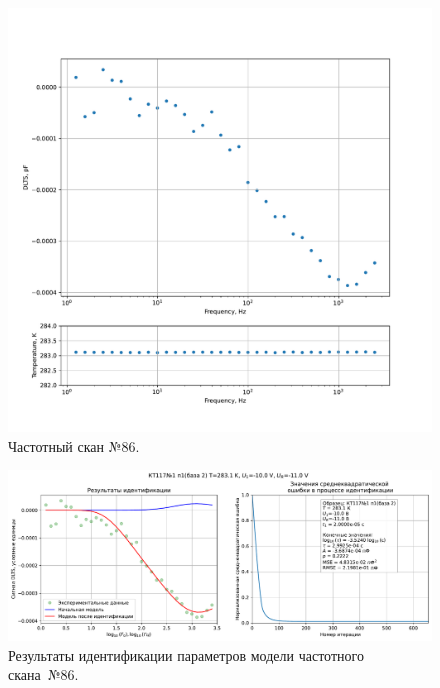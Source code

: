 \begin{figure}[!ht]
    \centering
    \includegraphics[width=1\textwidth]{../plots/КТ117№1_п1(база 2)_2500Гц-1Гц_1пФ_+10С_-10В-11В_10мВ_20мкс_шаг_0,1.pdf}
    \caption{Частотный скан №86.}
    \label{pic:frequency_scan_86}
\end{figure}

\begin{figure}[!ht]
    \centering
    \includegraphics[width=1\textwidth]{../plots/КТ117№1_п1(база 2)_2500Гц-1Гц_1пФ_+10С_-10В-11В_10мВ_20мкс_шаг_0,1_model.pdf}
    \caption{Результаты идентификации параметров модели частотного скана~№86.}
    \label{pic:frequency_scan_model86}
\end{figure}

\pagebreak


